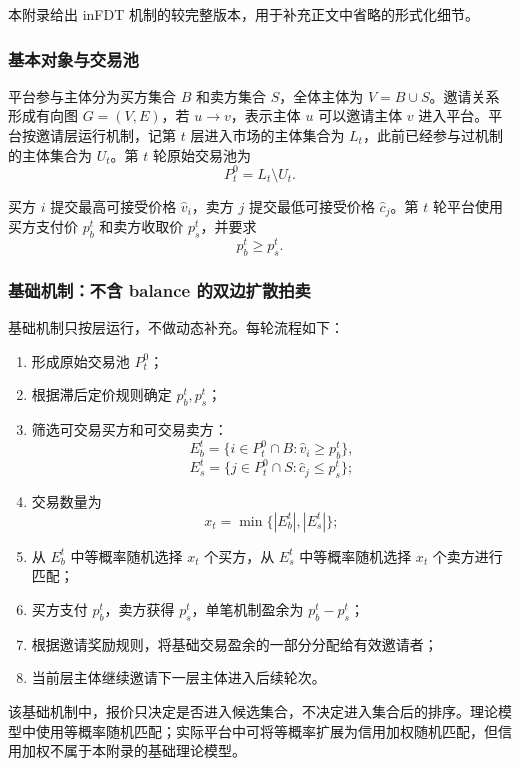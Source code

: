 \documentclass[UTF8,a4paper,12pt]{ctexart}
\begin{document}
本附录给出 inFDT 机制的较完整版本，用于补充正文中省略的形式化细节。

\subsubsection{基本对象与交易池}

平台参与主体分为买方集合 \(B\) 和卖方集合 \(S\)，全体主体为 \(V=B\cup S\)。邀请关系形成有向图 \(G=(V,E)\)，若 \(u\to v\)，表示主体 \(u\) 可以邀请主体 \(v\) 进入平台。平台按邀请层运行机制，记第 \(t\) 层进入市场的主体集合为 \(L_t\)，此前已经参与过机制的主体集合为 \(U_t\)。第 \(t\) 轮原始交易池为
\[
    P_t^0=L_t\setminus U_t.
\]

买方 \(i\) 提交最高可接受价格 \(\hat v_i\)，卖方 \(j\) 提交最低可接受价格 \(\hat c_j\)。第 \(t\) 轮平台使用买方支付价 \(p_b^t\) 和卖方收取价 \(p_s^t\)，并要求
\[
    p_b^t\ge p_s^t.
\]

\subsubsection{基础机制：不含 balance 的双边扩散拍卖}

基础机制只按层运行，不做动态补充。每轮流程如下：

\begin{enumerate}
    \item 形成原始交易池 \(P_t^0\)；
    \item 根据滞后定价规则确定 \(p_b^t,p_s^t\)；
    \item 筛选可交易买方和可交易卖方：
          \[
              E_b^t=\{i\in P_t^0\cap B:\hat v_i\ge p_b^t\},
          \]
          \[
              E_s^t=\{j\in P_t^0\cap S:\hat c_j\le p_s^t\};
          \]
    \item 交易数量为
          \[
              x_t=\min\{|E_b^t|,|E_s^t|\};
          \]
    \item 从 \(E_b^t\) 中等概率随机选择 \(x_t\) 个买方，从 \(E_s^t\) 中等概率随机选择 \(x_t\) 个卖方进行匹配；
    \item 买方支付 \(p_b^t\)，卖方获得 \(p_s^t\)，单笔机制盈余为 \(p_b^t-p_s^t\)；
    \item 根据邀请奖励规则，将基础交易盈余的一部分分配给有效邀请者；
    \item 当前层主体继续邀请下一层主体进入后续轮次。
\end{enumerate}

该基础机制中，报价只决定是否进入候选集合，不决定进入集合后的排序。理论模型中使用等概率随机匹配；实际平台中可将等概率扩展为信用加权随机匹配，但信用加权不属于本附录的基础理论模型。
\end{document}
